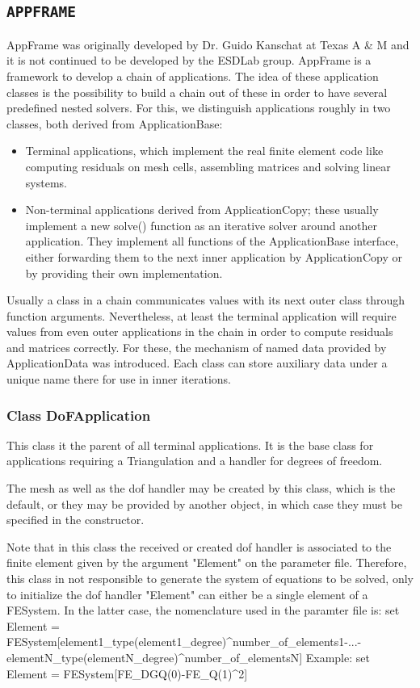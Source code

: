 \subsection{\texttt{APPFRAME}}
AppFrame was originally developed by Dr. Guido Kanschat at Texas A \& M and it is not continued to be developed by the ESDLab group. AppFrame is a framework to develop a chain of applications. The idea of these application classes is the possibility to build a chain out of these in order to have several predefined nested solvers. For this, we distinguish applications roughly in two classes, both derived from ApplicationBase:
\begin{itemize}
 \item Terminal applications, which implement the real finite element code like computing residuals on mesh cells, assembling matrices and solving linear systems.
 \item Non-terminal applications derived from ApplicationCopy; these usually implement a new solve() function as an iterative solver around another application. They implement all functions of the ApplicationBase interface, either forwarding them to the next inner application by ApplicationCopy or by providing their own implementation.
\end{itemize}

Usually a class in a chain communicates values with its next outer class through function arguments. Nevertheless, at least the terminal application will require values from even outer applications in the chain in order to compute residuals and matrices correctly. For these, the mechanism of named data provided by ApplicationData was introduced. Each class can store auxiliary data under a unique name there for use in inner iterations.

\subsubsection{Class DoFApplication}
This class it the parent of all terminal applications. It is the base class for applications requiring a Triangulation and a handler for degrees of freedom.

The mesh as well as the dof handler may be created by this class, which is the default, or they may be provided by another object, in which case they must be specified in the constructor.

Note that in this class the received or created dof handler is associated to the finite element given by the argument "Element" on the parameter file. Therefore, this class in not responsible to generate the system of equations to be solved, only to initialize the dof handler "Element" can either be a single element of a FESystem. In the latter case, the nomenclature used in the paramter file is: set Element = FESystem[element1\_type(element1\_degree)\textasciicircum number\_of\_elements1-...-elementN\_type(elementN\_degree)\textasciicircum number\_of\_elementsN] Example: set Element = FESystem[FE\_DGQ(0)-FE\_Q(1)\textasciicircum 2]

